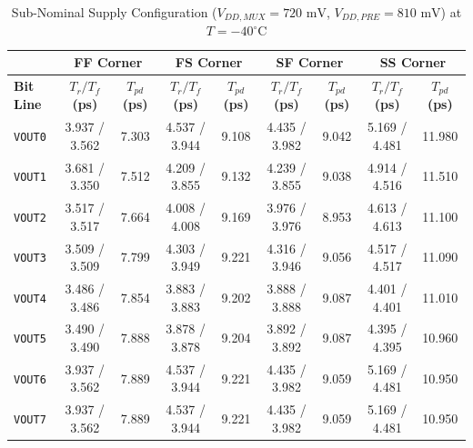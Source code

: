 \begin{table}[H]
    \centering
    \renewcommand{\arraystretch}{1.3}
    \setlength{\tabcolsep}{4pt}
    \small
    \begin{tabular}{|l|cc|cc|cc|cc|}
        \hline
        & \multicolumn{2}{c|}{\textbf{FF Corner}} & \multicolumn{2}{c|}{\textbf{FS Corner}} & \multicolumn{2}{c|}{\textbf{SF Corner}} & \multicolumn{2}{c|}{\textbf{SS Corner}} \\ \hline
        \textbf{Bit Line} & \textbf{$T_r / T_f$ (ps)} & \textbf{$T_{pd}$ (ps)} & \textbf{$T_r / T_f$ (ps)} & \textbf{$T_{pd}$ (ps)} & \textbf{$T_r / T_f$ (ps)} & \textbf{$T_{pd}$ (ps)} & \textbf{$T_r / T_f$ (ps)} & \textbf{$T_{pd}$ (ps)} \\ \hline
        \texttt{VOUT0} & 3.937 / 3.562 & 7.303 & 4.537 / 3.944 & 9.108 & 4.435 / 3.982 & 9.042 & 5.169 / 4.481 & 11.980 \\ 
        \texttt{VOUT1} & 3.681 / 3.350 & 7.512 & 4.209 / 3.855 & 9.132 & 4.239 / 3.855 & 9.038 & 4.914 / 4.516 & 11.510 \\ 
        \texttt{VOUT2} & 3.517 / 3.517 & 7.664 & 4.008 / 4.008 & 9.169 & 3.976 / 3.976 & 8.953 & 4.613 / 4.613 & 11.100 \\ 
        \texttt{VOUT3} & 3.509 / 3.509 & 7.799 & 4.303 / 3.949 & 9.221 & 4.316 / 3.946 & 9.056 & 4.517 / 4.517 & 11.090 \\ 
        \texttt{VOUT4} & 3.486 / 3.486 & 7.854 & 3.883 / 3.883 & 9.202 & 3.888 / 3.888 & 9.087 & 4.401 / 4.401 & 11.010 \\ 
        \texttt{VOUT5} & 3.490 / 3.490 & 7.888 & 3.878 / 3.878 & 9.204 & 3.892 / 3.892 & 9.087 & 4.395 / 4.395 & 10.960 \\ 
        \texttt{VOUT6} & 3.937 / 3.562 & 7.889 & 4.537 / 3.944 & 9.221 & 4.435 / 3.982 & 9.059 & 5.169 / 4.481 & 10.950 \\ 
        \texttt{VOUT7} & 3.937 / 3.562 & 7.889 & 4.537 / 3.944 & 9.221 & 4.435 / 3.982 & 9.059 & 5.169 / 4.481 & 10.950 \\ \hline
    \end{tabular}
    \vspace{2mm}
    \caption{Sub-Nominal Supply Configuration ($V_{DD,MUX} = 720\text{ mV}$, $V_{DD,PRE} = 810\text{ mV}$) at $T = -40^{\circ}\text{C}$}
    \label{tab:subnominal_sym_40}
\end{table}


